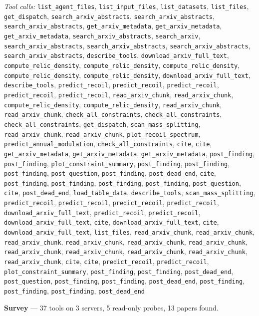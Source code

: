 \documentclass[11pt,a4paper]{article}
\begin{document}
\textit{Tool calls:} \texttt{list\_agent\_files}, \texttt{list\_input\_files}, \texttt{list\_datasets}, \texttt{list\_files}, \texttt{get\_dispatch}, \texttt{search\_arxiv\_abstracts}, \texttt{search\_arxiv\_abstracts}, \texttt{search\_arxiv\_abstracts}, \texttt{get\_arxiv\_metadata}, \texttt{get\_arxiv\_metadata}, \texttt{get\_arxiv\_metadata}, \texttt{search\_arxiv\_abstracts}, \texttt{search\_arxiv}, \texttt{search\_arxiv\_abstracts}, \texttt{search\_arxiv\_abstracts}, \texttt{search\_arxiv\_abstracts}, \texttt{search\_arxiv\_abstracts}, \texttt{describe\_tools}, \texttt{download\_arxiv\_full\_text}, \texttt{compute\_relic\_density}, \texttt{compute\_relic\_density}, \texttt{compute\_relic\_density}, \texttt{compute\_relic\_density}, \texttt{compute\_relic\_density}, \texttt{download\_arxiv\_full\_text}, \texttt{describe\_tools}, \texttt{predict\_recoil}, \texttt{predict\_recoil}, \texttt{predict\_recoil}, \texttt{predict\_recoil}, \texttt{predict\_recoil}, \texttt{read\_arxiv\_chunk}, \texttt{read\_arxiv\_chunk}, \texttt{compute\_relic\_density}, \texttt{compute\_relic\_density}, \texttt{read\_arxiv\_chunk}, \texttt{read\_arxiv\_chunk}, \texttt{check\_all\_constraints}, \texttt{check\_all\_constraints}, \texttt{check\_all\_constraints}, \texttt{get\_dispatch}, \texttt{scan\_mass\_splitting}, \texttt{read\_arxiv\_chunk}, \texttt{read\_arxiv\_chunk}, \texttt{plot\_recoil\_spectrum}, \texttt{predict\_annual\_modulation}, \texttt{check\_all\_constraints}, \texttt{cite}, \texttt{cite}, \texttt{get\_arxiv\_metadata}, \texttt{get\_arxiv\_metadata}, \texttt{get\_arxiv\_metadata}, \texttt{post\_finding}, \texttt{post\_finding}, \texttt{plot\_constraint\_summary}, \texttt{post\_finding}, \texttt{post\_finding}, \texttt{post\_finding}, \texttt{post\_question}, \texttt{post\_finding}, \texttt{post\_dead\_end}, \texttt{cite}, \texttt{post\_finding}, \texttt{post\_finding}, \texttt{post\_finding}, \texttt{post\_finding}, \texttt{post\_question}, \texttt{cite}, \texttt{post\_dead\_end}, \texttt{load\_table\_data}, \texttt{describe\_tools}, \texttt{scan\_mass\_splitting}, \texttt{predict\_recoil}, \texttt{predict\_recoil}, \texttt{predict\_recoil}, \texttt{predict\_recoil}, \texttt{download\_arxiv\_full\_text}, \texttt{predict\_recoil}, \texttt{predict\_recoil}, \texttt{download\_arxiv\_full\_text}, \texttt{cite}, \texttt{download\_arxiv\_full\_text}, \texttt{cite}, \texttt{download\_arxiv\_full\_text}, \texttt{list\_files}, \texttt{read\_arxiv\_chunk}, \texttt{read\_arxiv\_chunk}, \texttt{read\_arxiv\_chunk}, \texttt{read\_arxiv\_chunk}, \texttt{read\_arxiv\_chunk}, \texttt{read\_arxiv\_chunk}, \texttt{read\_arxiv\_chunk}, \texttt{read\_arxiv\_chunk}, \texttt{read\_arxiv\_chunk}, \texttt{read\_arxiv\_chunk}, \texttt{read\_arxiv\_chunk}, \texttt{cite}, \texttt{cite}, \texttt{predict\_recoil}, \texttt{predict\_recoil}, \texttt{plot\_constraint\_summary}, \texttt{post\_finding}, \texttt{post\_finding}, \texttt{post\_dead\_end}, \texttt{post\_question}, \texttt{post\_finding}, \texttt{post\_finding}, \texttt{post\_dead\_end}, \texttt{post\_finding}, \texttt{post\_finding}, \texttt{post\_finding}, \texttt{post\_dead\_end}\par
\textbf{Survey} --- 37 tools on 3 servers, 5 read-only probes, 13 papers found.
\end{document}
